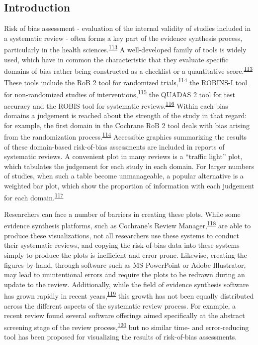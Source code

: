 \documentclass[a4paper, twoside]{templates/ociamthesis}
\begin{document}
\hypertarget{introduction-3}{%
\subsection{Introduction}\label{introduction-3}}

Risk of bias assessment - evaluation of the internal validity of studies included in a systematic review - often forms a key part of the evidence synthesis process, particularly in the health sciences.\textsuperscript{\protect\hyperlink{ref-cochranechpt7}{113}} A well-developed family of tools is widely used, which have in common the characteristic that they evaluate specific domains of bias rather being constructed as a checklist or a quantitative score.\textsuperscript{\protect\hyperlink{ref-cochranechpt7}{113}} These tools include the RoB 2 tool for randomized trials,\textsuperscript{\protect\hyperlink{ref-sterne2019rob}{114}} the ROBINS-I tool for non-randomized studies of interventions,\textsuperscript{\protect\hyperlink{ref-sterne2016robins}{115}} the QUADAS 2 tool for test accuracy and the ROBIS tool for systematic reviews.\textsuperscript{\protect\hyperlink{ref-whiting2011quadas}{116}} Within each bias domains a judgement is reached about the strength of the study in that regard: for example, the first domain in the Cochrane RoB 2 tool deals with bias arising from the randomization process.\textsuperscript{\protect\hyperlink{ref-sterne2019rob}{114}} Accessible graphics summarizing the results of these domain-based risk-of-bias assessments are included in reports of systematic reviews. A convenient plot in many reviews is a ``traffic light'' plot, which tabulates the judgement for each study in each domain. For larger numbers of studies, when such a table become unmanageable, a popular alternative is a weighted bar plot, which show the proportion of information with each judgement for each domain.\textsuperscript{\protect\hyperlink{ref-higgins2008assessing}{117}}

Researchers can face a number of barriers in creating these plots. While some evidence synthesis platforms, such as Cochrane's Review Manager,\textsuperscript{\protect\hyperlink{ref-cochrane2014review}{118}} are able to produce these visualizations, not all researchers use these systems to conduct their systematic reviews, and copying the risk-of-bias data into these systems simply to produce the plots is inefficient and error prone. Likewise, creating the figures by hand, through software such as MS PowerPoint or Adobe Illustrator, may lead to unintentional errors and require the plots to be redrawn during an update to the review. Additionally, while the field of evidence synthesis software has grown rapidly in recent years,\textsuperscript{\protect\hyperlink{ref-marshall2015systematic}{119}} this growth has not been equally distributed across the different aspects of the systematic review process. For example, a recent review found several software offerings aimed specifically at the abstract screening stage of the review process,\textsuperscript{\protect\hyperlink{ref-harrison2020software}{120}} but no similar time- and error-reducing tool has been proposed for visualizing the results of risk-of-bias assessments.
\end{document}
